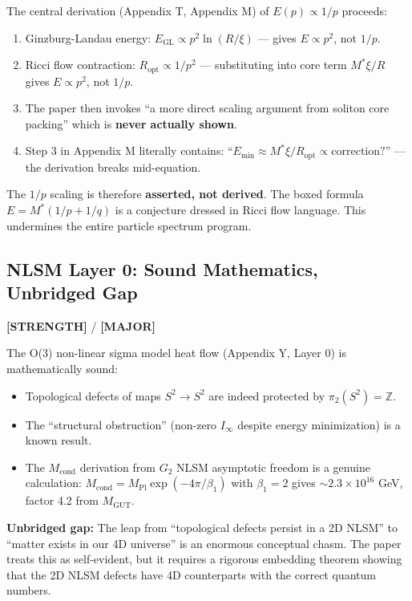 \documentclass[12pt, a4paper]{article}
\newcommand{\major}{\textcolor{major}{\textbf{[MAJOR]}}}
\newcommand{\positive}{\textcolor{positive}{\textbf{[STRENGTH]}}}
\begin{document}
The central derivation (Appendix T, Appendix M) of $E(p) \propto 1/p$ proceeds:

\begin{enumerate}
    \item Ginzburg-Landau energy: $E_{\text{GL}} \propto p^2 \ln(R/\xi)$ --- gives $E \propto p^2$, not $1/p$.
    \item Ricci flow contraction: $R_{\text{opt}} \propto 1/p^2$ --- substituting into core term $M^*\xi / R$ gives $E \propto p^2$, not $1/p$.
    \item The paper then invokes ``a more direct scaling argument from soliton core packing'' which is \textbf{never actually shown}.
    \item Step 3 in Appendix M literally contains: ``$E_{\text{min}} \approx M^*\xi / R_{\text{opt}} \propto \text{correction?}$'' --- the derivation breaks mid-equation.
\end{enumerate}

The $1/p$ scaling is therefore \textbf{asserted, not derived}. The boxed formula $E = M^*(1/p + 1/q)$ is a conjecture dressed in Ricci flow language. This undermines the entire particle spectrum program.

\subsection{NLSM Layer 0: Sound Mathematics, Unbridged Gap}
\positive{} / \major{}

The O(3) non-linear sigma model heat flow (Appendix Y, Layer 0) is mathematically sound:
\begin{itemize}
    \item Topological defects of maps $S^2 \to S^2$ are indeed protected by $\pi_2(S^2) = \mathbb{Z}$.
    \item The ``structural obstruction'' (non-zero $I_\infty$ despite energy minimization) is a known result.
    \item The $M_{\text{cond}}$ derivation from $G_2$ NLSM asymptotic freedom is a genuine calculation: $M_{\text{cond}} = M_{\text{Pl}} \exp(-4\pi/\beta_1)$ with $\beta_1 = 2$ gives $\sim 2.3 \times 10^{16}$ GeV, factor 4.2 from $M_{\text{GUT}}$.
\end{itemize}

\textbf{Unbridged gap:} The leap from ``topological defects persist in a 2D NLSM'' to ``matter exists in our 4D universe'' is an enormous conceptual chasm. The paper treats this as self-evident, but it requires a rigorous embedding theorem showing that the 2D NLSM defects have 4D counterparts with the correct quantum numbers.
\end{document}
